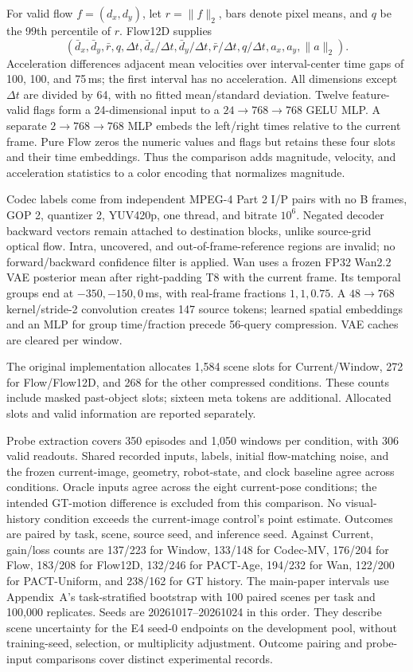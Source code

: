 For valid flow $f=(d_x,d_y)$, let $r=\|f\|_2$, bars denote pixel means,
and $q$ be the 99th percentile of $r$. Flow12D supplies
\[
(\bar d_x,\bar d_y,\bar r,q,\Delta t,
\bar d_x/\Delta t,\bar d_y/\Delta t,\bar r/\Delta t,q/\Delta t,
a_x,a_y,\|a\|_2).
\]
Acceleration differences adjacent mean velocities over interval-center
time gaps of 100, 100, and 75\,ms; the first interval has no acceleration.
All dimensions except $\Delta t$ are divided by 64, with no fitted
mean/standard deviation. Twelve feature-valid flags form a 24-dimensional
input to a $24\to768\to768$ GELU MLP. A separate $2\to768\to768$ MLP embeds
the left/right times relative to the current frame.
Pure Flow zeros the numeric values and flags but retains these four slots
and their time embeddings. Thus the comparison adds magnitude, velocity,
and acceleration statistics to a color encoding that normalizes magnitude.

Codec labels come from independent MPEG-4 Part 2 I/P pairs with no B frames,
GOP 2, quantizer 2, YUV420p, one thread, and bitrate $10^6$.
Negated decoder backward vectors remain attached to destination blocks,
unlike source-grid optical flow. Intra, uncovered, and out-of-frame-reference
regions are invalid; no forward/backward confidence filter is applied.
Wan uses a frozen FP32 Wan2.2 VAE posterior mean after right-padding T8
with the current frame. Its temporal groups end at $-350,-150,0$\,ms,
with real-frame fractions $1,1,0.75$. A $48\to768$ kernel/stride-2 convolution
creates 147 source tokens; learned spatial embeddings and an MLP for group
time/fraction precede 56-query compression. VAE caches are cleared per window.

The original implementation allocates 1,584 scene slots for Current/Window,
272 for Flow/Flow12D, and 268 for the other compressed conditions. These
counts include masked past-object slots; sixteen meta tokens are additional.
Allocated slots and valid information are reported separately.



Probe extraction covers 350 episodes and 1,050 windows per condition,
with 306 valid readouts. Shared recorded inputs, labels, initial
flow-matching noise, and the frozen current-image, geometry, robot-state,
and clock baseline agree across conditions. Oracle inputs agree across
the eight current-pose conditions; the intended GT-motion difference is
excluded from this comparison. No visual-history condition exceeds the
current-image control's point estimate. Outcomes are paired by task, scene,
source seed, and inference seed.
Against Current, gain/loss counts are 137/223 for Window, 133/148 for Codec-MV,
176/204 for Flow, 183/208 for Flow12D, 132/246 for PACT-Age,
194/232 for Wan, 122/200 for PACT-Uniform, and 238/162 for GT history.
The main-paper intervals use Appendix~A's task-stratified bootstrap with
100 paired scenes per task and 100,000 replicates. Seeds are 20261017--20261024
in this order. They describe scene uncertainty for the E4 seed-0 endpoints
on the development pool, without training-seed, selection, or multiplicity
adjustment. Outcome pairing and probe-input comparisons cover distinct
experimental records.

